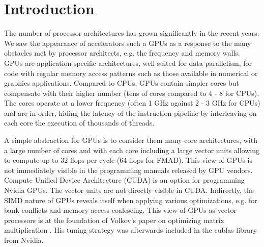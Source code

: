 \section{Introduction}
The number of processor architectures has grown significantly in the recent
years. We saw the appearance of accelerators such a GPUs as a response to the
many obstacles met by processor architects, e.g. the frequency and memory walls.
GPUs are application specific architectures, well suited for data parallelism,
for code with regular memory access patterns such as those available in
numerical or graphics applications. Compared to CPUs, GPUs contain simpler cores
but compensate with their higher number (tens of cores compared to 4 - 8 for
CPUs). The cores operate at a lower frequency (often 1 GHz against 2 - 3 GHz for
CPUs) and are in-order, hiding the latency of the instruction pipeline by
interleaving on each core the execution of thousands of threads.

A simple abstraction for GPUs is to consider them many-core architectures, with
a large number of cores and with each core including a large vector units
allowing to compute up to 32 flops per cycle (64 flops for FMAD). This view of
GPUs is not immediately visible in the programming manuals released by GPU
vendors. Compute Unified Device Architecture (CUDA) is an option for programming
Nvidia GPUs. The vector units are not directly visible in CUDA. Indirectly, the
SIMD nature of GPUs reveals itself when applying various optimizations, e.g. for
bank conflicts and memory access coalescing. This view of GPUs as vector
processors is at the foundation of Volkov's paper on optimizing matrix
multiplication \cite{volkov2008}. His tuning strategy was afterwards included in
the cublas library from Nvidia.


